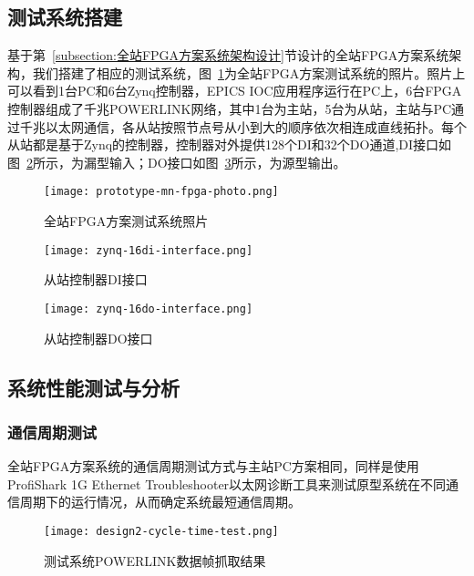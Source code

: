 \subsection{测试系统搭建}

基于第~\ref{subsection:全站FPGA方案系统架构设计}节设计的全站FPGA方案系统架构，我们搭建了相应的测试系统，图~\ref{fig:prototype-mn-fpga-photo}为全站FPGA方案测试系统的照片。照片上可以看到1台PC和6台Zynq控制器，EPICS IOC应用程序运行在PC上，6台FPGA控制器组成了千兆POWERLINK网络，其中1台为主站，5台为从站，主站与PC通过千兆以太网通信，各从站按照节点号从小到大的顺序依次相连成直线拓扑。每个从站都是基于Zynq的控制器，控制器对外提供128个DI和32个DO通道,DI接口如图~\ref{fig:zynq-16di-interface}所示，为漏型输入；DO接口如图~\ref{fig:zynq-16do-interface}所示，为源型输出。

\begin{figure}[htbp]
  \centering
  \texttt{[image: prototype-mn-fpga-photo.png]}
  \caption{全站FPGA方案测试系统照片}
  \label{fig:prototype-mn-fpga-photo}
\end{figure}

\begin{figure}[htbp]
  \centering
  \texttt{[image: zynq-16di-interface.png]}
  \caption{从站控制器DI接口}
  \label{fig:zynq-16di-interface}
\end{figure}

\begin{figure}[htbp]
  \centering
  \texttt{[image: zynq-16do-interface.png]}
  \caption{从站控制器DO接口}
  \label{fig:zynq-16do-interface}
\end{figure}

\subsection{系统性能测试与分析}
\label{subsection:系统性能测试与分析}

\subsubsection{通信周期测试}
\label{subsection:系统通信周期测试}
全站FPGA方案系统的通信周期测试方式与主站PC方案相同，同样是使用ProfiShark 1G Ethernet Troubleshooter以太网诊断工具来测试原型系统在不同通信周期下的运行情况，从而确定系统最短通信周期。

\begin{figure}[!htb]
  \centering
  \texttt{[image: design2-cycle-time-test.png]}
  \caption{测试系统POWERLINK数据帧抓取结果}
  \label{fig:design2-cycle-time-test}
\end{figure}

